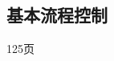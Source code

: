 \documentclass[11pt,oneside]{book}
\begin{document}
\begin{common-format}
\section{基本流程控制}
125页
%
%
%
%
%
%
%
% 
% 
%
% 
%
% 
%

%
% 
%
%
%
% 
%
% 
% 
%
% 

\end{common-format}
\end{document}
